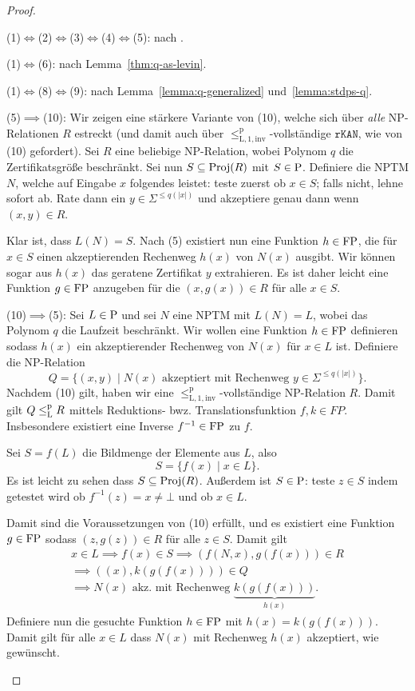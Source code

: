 \begin{proof}
\begin{prooflist}
\item (1)$\iff$(2)$\iff$(3)$\iff$(4)$\iff$(5): nach \textcite[Thm.~2]{fenner_inverting_2003}.

\item (1)$\iff$(6): nach Lemma~\ref{thm:q-as-levin}.

\item (1)$\iff$(8)$\iff$(9): nach Lemma~\ref{lemma:q-generalized} und~\ref{lemma:stdps-q}.

\item (5)$\implies$(10): Wir zeigen eine stärkere Variante von (10), welche sich über \emph{alle} NP-Relationen $R$ estreckt (und damit auch über $\leq_\mathrm{L,1,inv}^\mathrm p$-vollständige $\mathtt{rKAN}$, wie von (10) gefordert). Sei $R$ eine beliebige  NP-Relation, wobei Polynom $q$ die Zertifikatsgröße beschränkt. Sei nun $S\subseteq \Proj(R)$ mit $S\in \P$. Definiere die NPTM $N$, welche auf Eingabe $x$ folgendes leistet: teste zuerst ob $x\in S$; falls nicht, lehne sofort ab. Rate dann ein $y\in\Sigma^{\leq q(|x|)}$ und akzeptiere genau dann wenn $(x,y)\in R$. 

    Klar ist, dass $L(N)=S$. Nach (5) existiert nun eine Funktion $h\in \FP$, die für $x\in S$ einen akzeptierenden Rechenweg $h(x)$ von $N(x)$ ausgibt. Wir können sogar aus $h(x)$ das geratene Zertifikat $y$ extrahieren. Es ist daher leicht eine Funktion $g\in \FP$ anzugeben für die $(x,g(x))\in R$ für alle $x\in S$.

\item (10)$\implies$(5): Sei $L\in \P$ und sei $N$ eine NPTM mit $L(N)=L$, wobei das Polynom $q$ die Laufzeit beschränkt. Wir wollen eine Funktion $h\in\FP$ definieren sodass $h(x)$ ein akzeptierender Rechenweg von $N(x)$ für $x\in L$ ist. Definiere die NP-Relation
    \[ Q = \{ (x, y) \mid \text{$N(x)$ akzeptiert mit Rechenweg $y\in\Sigma^{\leq q(|x|)}$} \}. \]
    Nachdem (10) gilt, haben wir eine $\leq_\mathrm{L,1,inv}^\mathrm p$-vollständige NP-Relation $R$. Damit gilt $Q\leqlp R$ mittels Reduktions- bwz. Translationsfunktion $f, k\in FP$. Insbesondere existiert eine Inverse $f^{-1}\in\FP$ zu $f$.

    Sei $S=f(L)$ die Bildmenge der Elemente aus $L$, also 
    \[ S= \{f(x) \mid x\in L\}. \]
    Es ist leicht zu sehen dass $S\subseteq \Proj(R)$. Außerdem ist $S\in \P$: teste $z\in S$ indem getestet wird ob $f^{-1}(z)=x\neq\bot$ und ob $x\in L$.

    Damit sind die Voraussetzungen von (10) erfüllt, und es existiert eine Funktion $g\in \FP$ sodass $(z,g(z))\in R$ für alle $z\in S$. Damit gilt
    \begin{gather*}x\in L \implies f(x) \in S \implies (f(N,x), g(f(x)))\in R\\ \implies ((x), k(g(f(x))))\in Q\\
    \implies N(x) \text{ akz. mit Rechenweg $\underbrace{k(g(f(x)))}_{h(x)}$. }
\end{gather*}
    Definiere nun die gesuchte Funktion $h\in \FP$ mit $h(x) = k(g(f(x)))$. Damit gilt für alle $x\in L$ dass $N(x)$ mit Rechenweg $h(x)$ akzeptiert, wie gewünscht.


\end{prooflist}
\end{proof}
